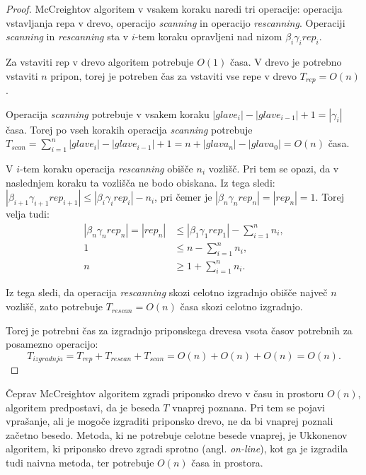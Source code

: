\begin{proof}
    McCreightov algoritem v vsakem koraku naredi tri operacije: operacija vstavljanja repa v drevo, operacijo \textit{scanning} in operacijo \textit{rescanning}. Operaciji  \textit{scanning} in \textit{rescanning} sta v $i$-tem koraku opravljeni nad nizom $\beta_i\gamma_i\textit{rep}_{i}$. 
    
    Za vstaviti rep v drevo algoritem potrebuje $O(1)$ časa. V drevo je potrebno vstaviti $n$ pripon, torej je potreben čas za vstaviti vse repe v drevo $T_{\textit{rep}}=O(n)$.

    Operacija \textit{scanning} potrebuje v vsakem koraku $|glave_i|-|glave_{i-1}|+1=|\gamma_i|$ časa. Torej po vseh korakih operacija \textit{scanning}  potrebuje $T_{\textit{scan}}=\sum_{i=1}^n |glave_i|-|glave_{i-1}|+1= n + |glava_n|-|glava_0|=O(n)$ časa.

    V $i$-tem koraku operacija \textit{rescanning} obišče $n_i$ vozlišč. Pri tem se opazi, da v naslednjem koraku ta vozlišča ne bodo obiskana. Iz tega sledi:  $|\beta_{i+1}\gamma_{i+1}\textit{rep}_{i+1}|\le|\beta_i\gamma_i\textit{rep}_{i}|-n_i$, pri čemer je $|\beta_n\gamma_n\textit{rep}_{n}|=|\textit{rep}_{n}|=1$. Torej velja tudi:    
    \begin{equation*} 
        \begin{split}
        |\beta_n\gamma_n\textit{rep}_{n}|=|\textit{rep}_{n}|&\le|\beta_1\gamma_1\textit{rep}_{1}|- \sum_{i=1}^n n_i,\\
        1&\le n- \sum_{i=1}^n n_i,\\
        n&\ge 1+ \sum_{i=1}^n n_i.
        \end{split}
    \end{equation*}
    
    Iz tega sledi, da operacija \textit{rescanning} skozi celotno izgradnjo obišče največ $n$ vozlišč, zato potrebuje $T_{\textit{rescan}}=O(n)$ časa skozi celotno izgradnjo.
    
    Torej je potrebni čas za izgradnjo priponskega drevesa vsota časov potrebnih za posamezno operacijo: 
    $$T_{\textit{izgradnja}}=T_{\textit{rep}}+T_{\textit{rescan}}+T_{\textit{scan}}=O(n)+O(n)+O(n)=O(n).$$
\end{proof}

Čeprav McCreightov algoritem zgradi priponsko drevo v času in prostoru $O(n)$, algoritem predpostavi, da je beseda $T$ vnaprej poznana. Pri tem se pojavi vprašanje, ali je mogoče izgraditi priponsko drevo, ne da bi vnaprej poznali začetno besedo. Metoda, ki ne potrebuje celotne besede vnaprej, je Ukkonenov algoritem, ki priponsko drevo zgradi sprotno (angl. \textit{on-line}), kot ga je izgradila tudi naivna metoda, ter potrebuje $O(n)$ časa in prostora.

